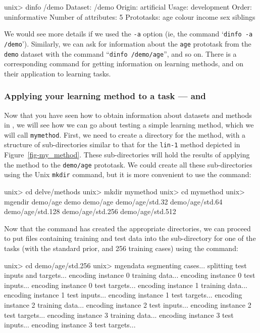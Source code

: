 \begin{Session}
unix> dinfo /demo
Dataset: /demo
Origin: artificial
Usage: development
Order: uninformative
Number of attributes: 5
Prototasks: 
        age
        colour
        income
        sex
        siblings
\end{Session}

We would see more details if we used the \texttt{-a} option (ie, 
the command `\texttt{dinfo -a /demo}').  Similarly, we can ask for
information about the \texttt{age} prototask from the \texttt{demo}
dataset with the command ``\texttt{dinfo /demo/age}'', and so on.
There is a corresponding \minfo{} command for getting information on
learning methods, and on their application to learning tasks.


\subsubsection*{Applying your learning method to a task --- \mgendir{} and 
                \mgendata{}}

Now that you have seen how to obtain information about datasets and
methods in \delve, we will see how we can go about testing a simple
learning method, which we will call {\tt mymethod}.  First, we need to
create a directory for the method, with a structure of sub-directories
similar to that for the \texttt{lin-1} method depicted in
Figure~\ref{fig-my_method}.  These sub-directories will hold the
results of applying the method to the \texttt{demo/age} prototask.  We
could create all these sub-directories using the Unix \texttt{mkdir}
command, but it is more convenient to use the \delve{} \mgendir{}
command:

\begin{Session}
unix> cd delve/methods
unix> mkdir mymethod
unix> cd mymethod
unix> mgendir demo/age
demo
demo/age
demo/age/std.32
demo/age/std.64
demo/age/std.128
demo/age/std.256
demo/age/std.512
\end{Session}

Now that the \mgendir{} command has created the appropriate
directories, we can proceed to put files containing training and test
data into the sub-directory for one of the tasks (with the standard
prior, and 256 training cases) using the \mgendata{} command:

\begin{Session}
unix> cd demo/age/std.256
unix> mgendata
  segmenting cases...
  splitting test inputs and targets...
  encoding instance 0 training data...
  encoding instance 0 test inputs...
  encoding instance 0 test targets...
  encoding instance 1 training data...
  encoding instance 1 test inputs...
  encoding instance 1 test targets...
  encoding instance 2 training data...
  encoding instance 2 test inputs...
  encoding instance 2 test targets...
  encoding instance 3 training data...
  encoding instance 3 test inputs...
  encoding instance 3 test targets...
\end{Session}

